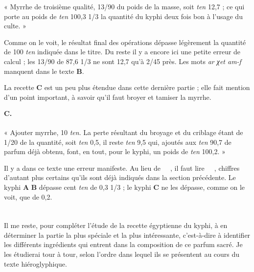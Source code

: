 \documentclass[a4paper, 11pt, oneside]{article}
\newcommand*\hieroAAAB{}
\newcommand*\hieroAAAE{}
\newcommand*\hieroAAAM{}
\newcommand*\hieroAAAR{}
\newcommand*\hieroAADF{}
\newcommand*\hieroAAEB{}
\newcommand*\hieroAAFI{}
\newcommand*\hieroAAGA{}
\newcommand*\hieroAAGM{}
\newcommand*\hieroAAGS{\raisebox{0.4ex}{}}
\newcommand*\hieroAAHC{\raisebox{1ex}{}}
\newcommand*\hieroAAHO{\raisebox{0.6ex}{}}
\newcommand*\hieroAAII{}
\newcommand*\hieroAAIM{}
\newcommand*\hieroAAJB{}
\newcommand*\hieroAAJG{}
\newcommand*\hieroAAJV{}
\newcommand*\hieroAAMQ{}
\newcommand*\hieroAAOU{}
\newcommand*\hieroAAPQ{}
\newcommand*\hieroAAQZ{}
\newcommand*\hieroAARL{\raisebox{0.4ex}{}}
\newcommand*\hieroAASM{}
\newcommand*\hieroAASO{}
\newcommand*\hieroAASZ{}
\newcommand*\hieroAAUG{}
\newcommand*\hieroAAUH{}
\newcommand*\hieroAAUI{}
\newcommand*\hieroAAUJ{}
\newcommand*\hieroAAUK{}
\newcommand*\hieroAAUL{}
\newcommand*\hieroAAUM{}
\newcommand*\hieroAAUN{}
\newcommand*\hieroAAUO{}
\newcommand*\hieroAAUP{}
\begin{document}
« Myrrhe de troisième qualité, 13/90 du poids de la masse, soit \emph{ten} 12,7 ; ce qui porte au poids de \emph{ten} 100,3 1/3 la quantité du kyphi deux fois bon à l'usage du culte. »

Comme on le voit, le résultat final des opérations dépasse légèrement la quantité de 100 \emph{ten} indiquée dans le titre. Du reste il y a encore ici une petite erreur de calcul ; les 13/90 de 87,6 1/3 ne sont 12,7 qu'à 2/45 près. Les mots \emph{ar χet am-f} manquent dans le texte \textbf{B}.

La recette \textbf{C} est un peu plus étendue dans cette dernière partie ; elle fait mention d'un point important, à savoir qu'il faut broyer et tamiser la myrrhe.

\hspace*{10mm}\textbf{C.}\hspace*{5mm} $\hieroAAUG\:\hieroAADF\:\hieroAAAM\:\hieroAAAM\:\hieroAAAR\:\hieroAASO\:\hieroAAFI\:\hieroAAHC\:\hieroAAAB\:\hieroAAUH\:\hieroAAQZ\:\hieroAAUI\:\hieroAAIM\:\hieroAAUJ\:\hieroAAGS\:\hieroAAPQ$ \\\hspace*{10mm} $\hieroAAUK\:\hieroAAGA\:\hieroAAJB\:\hieroAAUL\:\hieroAARL\:\hieroAASZ\:\hieroAAUM\:\hieroAAGA\:\hieroAAJB\:\hieroAAHO\:\hieroAAEB\:\hieroAAII\:\hieroAAAE\:\hieroAAAR\:\hieroAAUN\:\hieroAASM\:\hieroAAGA\:\hieroAAJG\:\hieroAAUO\:\hieroAAAR$ \\\hspace*{10mm} $\hieroAAUP\:\hieroAAGA\:\hieroAAJV$

« Ajouter myrrhe, 10 \emph{ten}. La perte résultant du broyage et du criblage étant de 1/20 de la quantité, soit \emph{ten} 0,5, il reste \emph{ten} 9,5 qui, ajoutés aux \emph{ten} 90,7 de parfum déjà obtenu, font, en tout, pour le kyphi, un poids de \emph{ten} 100,2. »

Il y a dans ce texte une erreur manifeste. Au lieu de $\hieroAAUN\:\hieroAAMQ\:\hieroAAMQ\:\hieroAAMQ\:\hieroAAGA\:\hieroAAJG$, il faut lire $\hieroAAOU\:\hieroAAMQ\:\hieroAAMQ\:\hieroAAMQ\:\hieroAAGA\:\hieroAAGM$, chiffres d'autant plus certains qu'ils sont déjà indiqués dans la section précédente. Le kyphi \textbf{A} \textbf{B} dépasse cent \emph{ten} de 0,3 1/3 ; le kyphi \textbf{C} ne les dépasse, comme on le voit, que de 0,2.
\clearpage
\section{}
\paragraph{}
Il me reste, pour compléter l'étude de la recette égyptienne du kyphi, à en déterminer la partie la plus spéciale et la plus intéressante, c'est-à-dire à identifier les différents ingrédients qui entrent dans la composition de ce parfum sacré. Je les étudierai tour à tour, selon l'ordre dans lequel ils se présentent au cours du texte hiéroglyphique.
\end{document}

